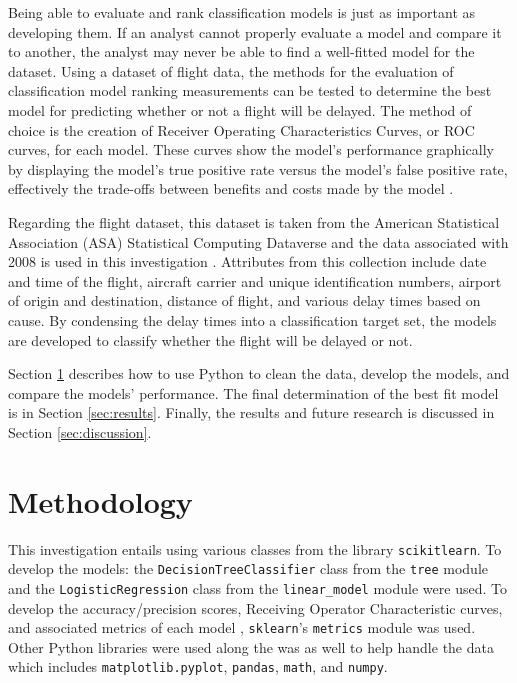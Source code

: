 \documentclass[journal]{IEEEtran}
\begin{document}
Being able to evaluate and rank classification models is just as important as developing them. If an analyst cannot properly evaluate a model and compare it to another, the analyst may never be able to find a well-fitted model for the dataset. Using a dataset of flight data, the methods for the evaluation of classification model ranking measurements can be tested to determine the best model for predicting whether or not a flight will be delayed. The method of choice is the creation of Receiver Operating Characteristics Curves, or ROC curves, for each model. These curves show the model's performance graphically by displaying the model's true positive rate versus the model's false positive rate, effectively the trade-offs between benefits and costs made by the model \cite{b1}. 

Regarding the flight dataset, this dataset is taken from the American Statistical Association (ASA) Statistical Computing Dataverse and the data associated with 2008 is used in this investigation \cite{b2}. Attributes from this collection include date and time of the flight, aircraft carrier and unique identification numbers, airport of origin and destination, distance of flight, and various delay times based on cause. By condensing the delay times into a classification target set, the models are developed to classify whether the flight will be delayed or not. 

Section \ref{sec:methodology} describes how to use Python to clean the data, develop the models, and compare the models' performance. The final determination of the best fit model is in Section \ref{sec:results}. Finally, the results and future research is discussed in Section \ref{sec:discussion}. 

\section{Methodology}
\label{sec:methodology}

This investigation entails using various classes from the library \lstinline{scikitlearn}. To develop the models: the \lstinline{DecisionTreeClassifier} class from the \lstinline{tree} module and the \lstinline{LogisticRegression} class from the \lstinline{linear_model} module were used. To develop the accuracy/precision scores, Receiving Operator Characteristic curves, and associated metrics of each model ,  \lstinline{sklearn}'s \lstinline{metrics} module was used. Other Python libraries were used along the was as well to help handle the data which includes \lstinline{matplotlib.pyplot}, \lstinline{pandas}, \lstinline{math}, and \lstinline{numpy}. 
\end{document}
